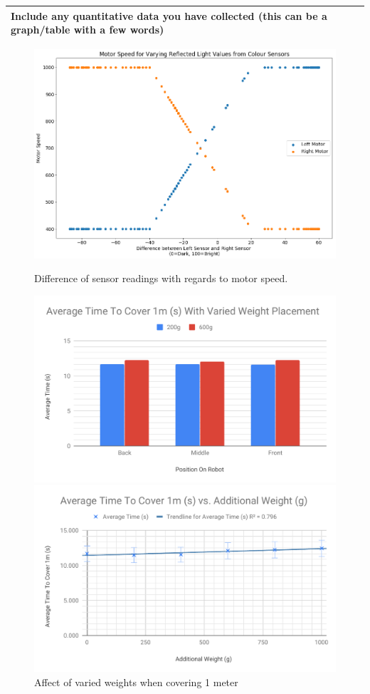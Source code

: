 \documentclass[a4paper]{article}
\newcommand{\colWidth}{141mm}
\begin{document}
\begin{center}
\newpage
\begin{tabular}{|p{\colWidth}|}
	\hline
	\cellcolor{blue!25}\large
	\textbf{Include any quantitative data you have collected (this can be a graph/table with a few words)}
  \\
  \hline
\end{tabular}
\begin{figure}[!htb]
  \includegraphics[width=\linewidth]{motor_colour.png}
  \caption{Difference of sensor readings with regards to motor speed.}\label{fig:awesome_image1}
\endminipage\hfill
     \includegraphics[width=\textwidth]{time_weight.pdf}
     \caption{Affect of varied weights when covering 1 meter}\label{fig:awesome_image2}
\endminipage\hfill
{}
      \includegraphics[width=\textwidth]{time_weight2.pdf}

\end{figure}
\end{center}
\end{document}
